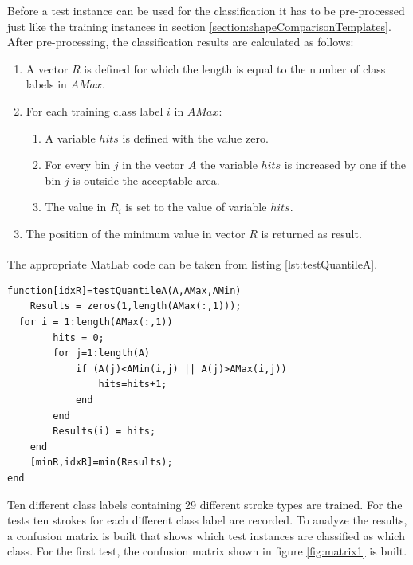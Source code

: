 Before a test instance can be used for the classification it has to be pre-processed just like the training instances in section \ref{section:shapeComparisonTemplates}. After pre-processing, the classification results are calculated as follows:

\begin{enumerate}
	\item A vector $R$ is defined for which the length is equal to the number of class labels in $AMax$.
	\item For each training class label $i$ in $AMax$:
		\begin{enumerate}
			\item A variable $hits$ is defined with the value zero.
			\item For every bin $j$ in the vector $A$ the variable $hits$ is increased by one if the bin $j$ is outside the acceptable area.
			\item The value in $R_i$ is set to the value of variable $hits$.
		\end{enumerate}
	\item The position of the minimum value in vector $R$ is returned as result.
\end{enumerate}

The appropriate MatLab\textsuperscript{\textregistered} code can be taken from listing \ref{lst:testQuantileA}.

\begin{lstlisting}[caption={testQuantileA},label={lst:testQuantileA}]
function[idxR]=testQuantileA(A,AMax,AMin)
	Results = zeros(1,length(AMax(:,1)));    
  for i = 1:length(AMax(:,1))
		hits = 0;  
		for j=1:length(A)
			if (A(j)<AMin(i,j) || A(j)>AMax(i,j))  
				hits=hits+1;
			end
		end
		Results(i) = hits; 
	end
	[minR,idxR]=min(Results);
end
\end{lstlisting}

Ten different class labels containing 29 different stroke types are trained. For the tests ten strokes for each different class label are recorded. To analyze the results, a confusion matrix is built that shows which test instances are classified as which class. For the first test, the confusion matrix shown in figure \ref{fig:matrix1} is built.



